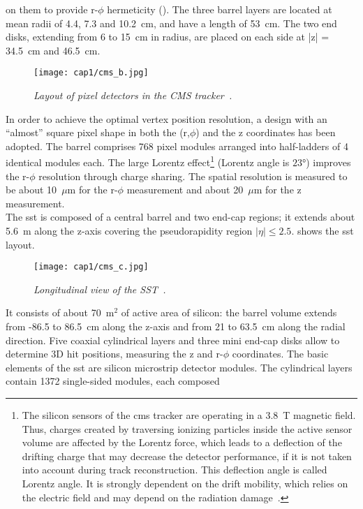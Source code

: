 on them to provide r-$\phi$ hermeticity (). The three barrel layers
are located at mean radii of 4.4, 7.3 and 10.2~cm, and have a length of
53~cm. The two end disks, extending from 6 to 15~cm in radius, are placed on
each side at |z| = 34.5~cm and 46.5~cm.
\begin{figure}[!htbp]
  \centering
  \texttt{[image: cap1/cms\_b.jpg]}
  \caption{\textit{Layout of pixel detectors in the CMS
      tracker~\cite{CMS_tech}.}}\label{cms_b}
\end{figure}
In order to achieve the optimal vertex position resolution, a design with an
``almost'' square pixel shape in both the (r,$\phi$) and the z coordinates has
been adopted. The barrel comprises 768 pixel modules arranged into half-ladders
of 4 identical modules each.  The large Lorentz effect\footnote{The silicon
  sensors of the \gls{cms} tracker are operating in a 3.8~T magnetic
  field. Thus, charges created by traversing ionizing particles inside the
  active sensor volume are affected by the Lorentz force, which leads to a
  deflection of the drifting charge that may decrease the detector performance,
  if it is not taken into account during track reconstruction. This deflection
  angle is called Lorentz angle. It is strongly dependent on the drift mobility,
  which relies on the electric field and may depend on the radiation
  damage~\cite{Nuernberg}.} (Lorentz angle is $\ang{23}$) improves the r-$\phi$
resolution through charge sharing. The spatial resolution is measured to be
about 10~$\mu$m for the r-$\phi$
measurement and about 20~$\mu$m for the z measurement.\\
The \gls{sst} is composed of a central barrel and two end-cap regions; it
extends about 5.6~m along the z-axis covering the pseudorapidity region
$|\eta| \leq 2.5$.  shows the \gls{sst} layout.
\begin{figure}[!htbp]
  \centering
  \texttt{[image: cap1/cms\_c.jpg]}
  \caption{\textit{Longitudinal view of the SST~\cite{My}.}}\label{cms_c}
\end{figure}
It consists of about 70~m$^2$ of active area of silicon: the barrel volume
extends from -86.5 to 86.5~cm along the z-axis and from 21 to 63.5~cm along the
radial direction. Five coaxial cylindrical layers and three mini end-cap disks
allow to determine 3D hit positions, measuring the z and r-$\phi$
coordinates. The basic elements of the \gls{sst} are silicon microstrip detector
modules. The cylindrical layers contain 1372 single-sided modules, each composed
